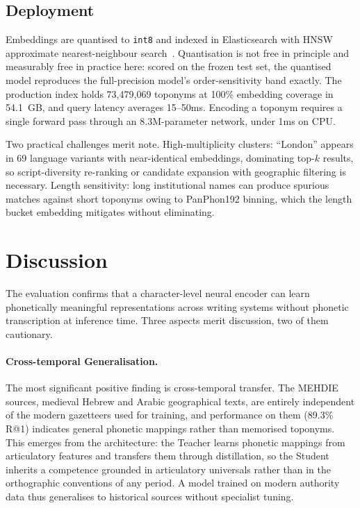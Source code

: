 \documentclass[11pt,a4paper]{article}
\begin{document}
\subsection{Deployment}
\label{subsec:deployment}

Embeddings are quantised to \texttt{int8} and indexed in Elasticsearch with HNSW approximate nearest-neighbour search~\citep{malkov2020hnsw}. Quantisation is not free in principle and measurably free in practice here: scored on the frozen test set, the quantised model reproduces the full-precision model's order-sensitivity band exactly. The production index holds 73,479,069 toponyms at 100\% embedding coverage in 54.1~GB, and query latency averages 15--50ms. Encoding a toponym requires a single forward pass through an 8.3M-parameter network, under 1ms on CPU.

Two practical challenges merit note. High-multiplicity clusters: ``London'' appears in 69 language variants with near-identical embeddings, dominating top-$k$ results, so script-diversity re-ranking or candidate expansion with geographic filtering is necessary. Length sensitivity: long institutional names can produce spurious matches against short toponyms owing to PanPhon192 binning, which the length bucket embedding mitigates without eliminating.
\section{Discussion}
\label{sec:discussion}

The evaluation confirms that a character-level neural encoder can learn phonetically meaningful representations across writing systems without phonetic transcription at inference time. Three aspects merit discussion, two of them cautionary.

\paragraph{Cross-temporal Generalisation.} The most significant positive finding is cross-temporal transfer. The MEHDIE sources, medieval Hebrew and Arabic geographical texts, are entirely independent of the modern gazetteers used for training, and performance on them (89.3\% R@1) indicates general phonetic mappings rather than memorised toponyms. This emerges from the architecture: the Teacher learns phonetic mappings from articulatory features and transfers them through distillation, so the Student inherits a competence grounded in articulatory universals rather than in the orthographic conventions of any period. A model trained on modern authority data thus generalises to historical sources without specialist tuning.
\end{document}
